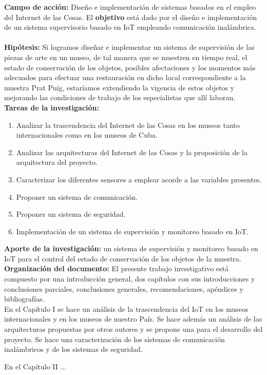     \textbf{Campo de acción: }Diseño e implementación de sistemas basados en el empleo del Internet de las Cosas. El \textbf{objetivo} está dado por el diseño e implementación de un sistema supervisorio basado en IoT empleando comunicación inalámbrica.\\\\

    \textbf{Hipótesis: }Si logramos diseñar e implementar un sistema de supervisión de las piezas de arte en un museo, de tal manera que se muestren en tiempo real, el estado de conservación de los objetos, posibles afectaciones y los momentos más adecuados para efectuar una restauración en dicho local correspondiente a la muestra Prat Puig, estaríamos extendiendo la vigencia de estos objetos y mejorando las condiciones de trabajo de los especialistas que allí laboran.\\

    \textbf{Tareas de la investigación:}
    \begin{enumerate} %
        \item Analizar la trascendencia del Internet de las Cosas en los museos tanto internacionales como en los museos de Cuba.
        \item Analizar las arquitecturas del Internet de las Cosas y la proposición de la arquitectura del proyecto.
        \item Caracterizar los diferentes sensores a emplear acorde a las variables presentes.
        \item Proponer un sistema de comunicación.
        \item Proponer un sistema de seguridad.
        \item Implementación de un sistema de supervisión y monitoreo basado en IoT.
    \end{enumerate}

    \textbf{Aporte de la investigación: } un sistema de supervisión y monitoreo basado en IoT para el control del estado de conservación de los objetos de la muestra.\\

    \textbf{Organización del documento: }El presente trabajo investigativo está compuesto por una introducción general, dos capítulos con sus introducciones y conclusiones parciales, conclusiones generales, recomendaciones, apéndices y bibliografías.\\

    En el Capítulo I se hace un análisis de la trascendencia del IoT en los museos internacionales y en los museos de nuestro País.
    Se hace además un análisis de las arquitecturas propuestas por otros autores y se propone una para el desarrollo del proyecto.
    Se hace una caracterización de los sistemas de comunicación inalámbricos y de los sistemas de seguridad.

    En el Capítulo II ...    

    